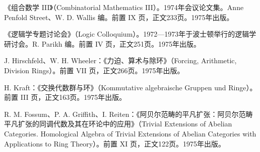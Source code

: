 \begin{description}[style=nextline,leftmargin=1.5em,itemsep=7pt]
\item[第452卷]《组合数学 III》（Combinatorial Mathematics III）。1974年会议论文集。Anne Penfold Street、W. D. Wallis 编。前置 IX 页，正文233页。1975年出版。
\item[第453卷]《逻辑学专题讨论会》（Logic Colloquium）。1972—1973年于波士顿举行的逻辑学研讨会。R. Parikh 编。前置 IV 页，正文251页。1975年出版。
\item[第454卷] J. Hirschfeld、W. H. Wheeler：《力迫、算术与除环》（Forcing, Arithmetic, Division Rings）。前置 VII 页，正文266页。1975年出版。
\item[第455卷] H. Kraft：《交换代数群与环》（Kommutative algebraische Gruppen und Ringe）。前置 III 页，正文163页。1975年出版。
\item[第456卷] R. M. Fossum、P. A. Griffith、I. Reiten：《阿贝尔范畴的平凡扩张：阿贝尔范畴平凡扩张的同调代数及其在环论中的应用》（Trivial Extensions of Abelian Categories. Homological Algebra of Trivial Extensions of Abelian Categories with Applications to Ring Theory）。前置 XI 页，正文122页。1975年出版。
\end{description}
